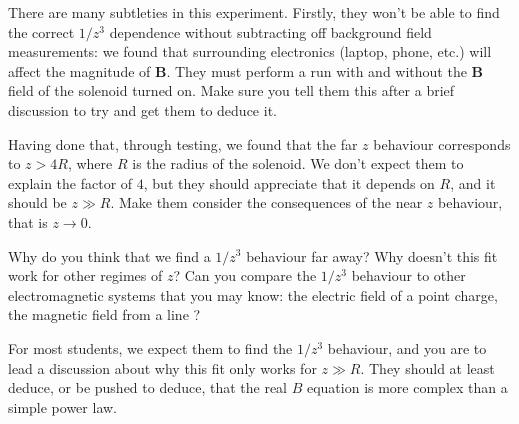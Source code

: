 \documentclass[12pt]{report}
\begin{document}
\begin{tcolorbox}
There are many subtleties in this experiment. Firstly, they won't be able to find the correct $1/z^3$ dependence without subtracting off background field measurements: we found that surrounding electronics (laptop, phone, etc.) will affect the magnitude of $\mathbf{B}$. They must perform a run with and without the $\mathbf{B}$ field of the solenoid turned on. Make sure you tell them this after a brief discussion to try and get them to deduce it.
\end{tcolorbox}
\begin{tcolorbox}
Having done that, through testing, we found that the far $z$ behaviour corresponds to $z>4R$, where $R$ is the radius of the solenoid. We don't expect them to explain the factor of $4$, but they should appreciate  that it depends on $R$, and it should be $z \gg R$. Make them consider the consequences of the near $z$ behaviour, that is $z \rightarrow 0$.
\end{tcolorbox}


{\color{blue} Why do you think that we find a $1/z^3$ behaviour far away?
Why doesn't this fit work for other regimes of $z$?
Can you compare the $1/z^3$ behaviour to other electromagnetic systems that you may know: the electric field of a point charge, the magnetic field from a line
?}
\begin{tcolorbox}
For most students, we expect them to find the $1/z^3$ behaviour, and you are to lead a discussion about why this fit only works for $z\gg R$. They should at least deduce, or be pushed to deduce, that the real $B$ equation is more complex than a simple power law.
\end{tcolorbox}
\end{document}
